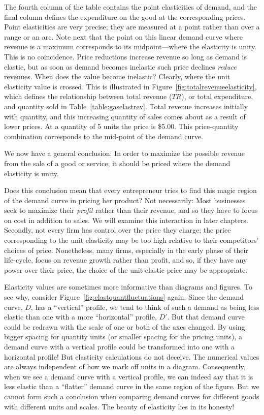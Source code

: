 The fourth column of the table contains the point elasticities of demand, and the final column defines the expenditure on the good at the corresponding prices. Point elasticities are very precise; they are measured at a point rather than over a range or an arc. Note next that the point on this linear demand curve where revenue is a maximum corresponds to its midpoint---where the elasticity is unity. This is no coincidence. Price reductions increase revenue so long as demand is elastic, but as soon as demand becomes inelastic such price declines \textit{reduce} revenues. When does the value become inelastic? Clearly, where the unit elasticity value is crossed. This is illustrated in Figure~\ref{fig:totalrevenueelasticity}, which defines the relationship between total revenue ($TR$), or total expenditure, and quantity sold in Table~\ref{table:gaselastrev}. Total revenue increases initially with quantity, and this increasing quantity of sales comes about as a result of lower prices. At a quantity of 5 units the price is \$5.00. This price-quantity combination corresponds to the mid-point of the demand curve.



We now have a general conclusion: In order to maximize the possible revenue from the sale of a good or service, it should be priced where the demand elasticity is unity. 

Does this conclusion mean that every entrepreneur tries to find this magic region of the demand curve in pricing her product? Not necessarily: Most businesses seek to maximize their \textit{profit} rather than their revenue, and so they have to focus on cost in addition to sales. We will examine this interaction in later chapters. Secondly, not every firm has control over the price they charge; the price corresponding to the unit elasticity may be too high relative to their competitors' choices of price. Nonetheless, many firms, especially in the early phase of their life-cycle, focus on revenue growth rather than profit, and so, if they have any power over their price, the choice of the unit-elastic price may be appropriate.

Elasticity values are sometimes more informative than diagrams and figures. To see why, consider Figure~\ref{fig:elastquantfluctuations} again. Since the demand curve, $D$, has a ``vertical'' profile, we tend to think of such a demand as being less elastic than one with a more ``horizontal'' profile, $D'$. But that demand curve could be redrawn with the scale of one or both of the axes changed. By using bigger spacing for quantity units (or smaller spacing for the pricing units), a demand curve with a vertical profile could be transformed into one with a horizontal profile! But elasticity calculations do not deceive. The numerical values are always independent of how we mark off units in a diagram. Consequently, when we see a demand curve with a vertical profile, we can indeed say that it is less elastic than a ``flatter'' demand curve in the same region of the figure. But we cannot form such a conclusion when comparing demand curves for different goods with different units and scales. The beauty of elasticity lies in its honesty!